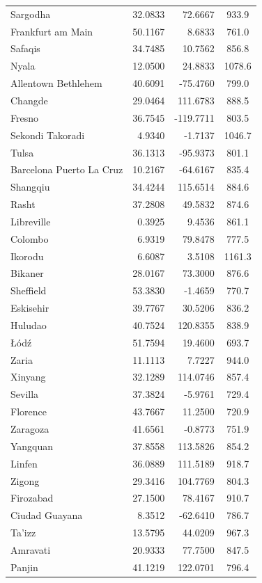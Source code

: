 \begin{longtable}{lrrc}
Sargodha & 32.0833 & 72.6667 & 933.9 \\
Frankfurt am Main & 50.1167 & 8.6833 & 761.0 \\
Safaqis & 34.7485 & 10.7562 & 856.8 \\
Nyala & 12.0500 & 24.8833 & 1078.6 \\
Allentown Bethlehem & 40.6091 & -75.4760 & 799.0 \\
Changde & 29.0464 & 111.6783 & 888.5 \\
Fresno & 36.7545 & -119.7711 & 803.5 \\
Sekondi Takoradi & 4.9340 & -1.7137 & 1046.7 \\
Tulsa & 36.1313 & -95.9373 & 801.1 \\
Barcelona Puerto La Cruz & 10.2167 & -64.6167 & 835.4 \\
Shangqiu & 34.4244 & 115.6514 & 884.6 \\
Rasht & 37.2808 & 49.5832 & 874.6 \\
Libreville & 0.3925 & 9.4536 & 861.1 \\
Colombo & 6.9319 & 79.8478 & 777.5 \\
Ikorodu & 6.6087 & 3.5108 & 1161.3 \\
Bikaner & 28.0167 & 73.3000 & 876.6 \\
Sheffield & 53.3830 & -1.4659 & 770.7 \\
Eskisehir & 39.7767 & 30.5206 & 836.2 \\
Huludao & 40.7524 & 120.8355 & 838.9 \\
Łódź & 51.7594 & 19.4600 & 693.7 \\
Zaria & 11.1113 & 7.7227 & 944.0 \\
Xinyang & 32.1289 & 114.0746 & 857.4 \\
Sevilla & 37.3824 & -5.9761 & 729.4 \\
Florence & 43.7667 & 11.2500 & 720.9 \\
Zaragoza & 41.6561 & -0.8773 & 751.9 \\
Yangquan & 37.8558 & 113.5826 & 854.2 \\
Linfen & 36.0889 & 111.5189 & 918.7 \\
Zigong & 29.3416 & 104.7769 & 804.3 \\
Firozabad & 27.1500 & 78.4167 & 910.7 \\
Ciudad Guayana & 8.3512 & -62.6410 & 786.7 \\
Ta'izz & 13.5795 & 44.0209 & 967.3 \\
Amravati & 20.9333 & 77.7500 & 847.5 \\
Panjin & 41.1219 & 122.0701 & 796.4 \\

\end{longtable}
